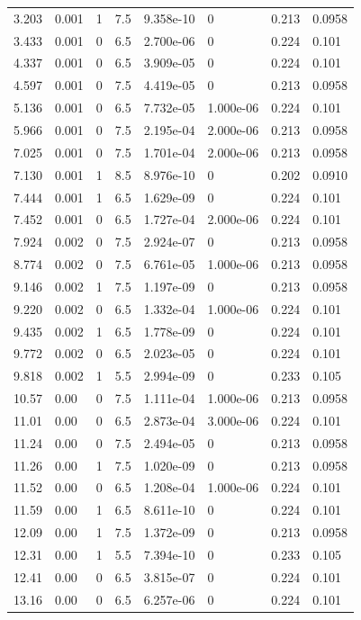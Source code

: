 \documentclass[preview]{standalone}
\begin{document}
{{\begin{tabular}{L{1.2cm}C{1.2cm} C{0.3cm}C{0.5cm} C{1.4cm}C{1.4cm} C{1.4cm}C{1.4cm}}
  3.203  &  0.001  & 1     & 7.5 &  9.358e-10  & 0  & 0.213 &  0.0958   \\ 
  3.433  &  0.001  & 0     & 6.5 &  2.700e-06  & 0  & 0.224 &  0.101   \\ 
  4.337  &  0.001  & 0     & 6.5 &  3.909e-05  & 0  & 0.224 &  0.101   \\ 
  4.597  &  0.001  & 0     & 7.5 &  4.419e-05  & 0  & 0.213 &  0.0958   \\ 
  5.136  &  0.001  & 0     & 6.5 &  7.732e-05  & 1.000e-06  & 0.224 &  0.101   \\ 
  5.966  &  0.001  & 0     & 7.5 &  2.195e-04  & 2.000e-06  & 0.213 &  0.0958   \\ 
  7.025  &  0.001  & 0     & 7.5 &  1.701e-04  & 2.000e-06  & 0.213 &  0.0958   \\ 
  7.130  &  0.001  & 1     & 8.5 &  8.976e-10  & 0  & 0.202 &  0.0910   \\ 
  7.444  &  0.001  & 1     & 6.5 &  1.629e-09  & 0  & 0.224 &  0.101   \\ 
  7.452  &  0.001  & 0     & 6.5 &  1.727e-04  & 2.000e-06  & 0.224 &  0.101   \\ 
  7.924  &  0.002  & 0     & 7.5 &  2.924e-07  & 0  & 0.213 &  0.0958   \\ 
  8.774  &  0.002  & 0     & 7.5 &  6.761e-05  & 1.000e-06  & 0.213 &  0.0958   \\ 
  9.146  &  0.002  & 1     & 7.5 &  1.197e-09  & 0  & 0.213 &  0.0958   \\ 
  9.220  &  0.002  & 0     & 6.5 &  1.332e-04  & 1.000e-06  & 0.224 &  0.101   \\ 
  9.435  &  0.002  & 1     & 6.5 &  1.778e-09  & 0  & 0.224 &  0.101   \\ 
  9.772  &  0.002  & 0     & 6.5 &  2.023e-05  & 0  & 0.224 &  0.101   \\ 
  9.818  &  0.002  & 1     & 5.5 &  2.994e-09  & 0  & 0.233 &  0.105   \\ 
  10.57  &  0.00  & 0     & 7.5 &  1.111e-04  & 1.000e-06  & 0.213 &  0.0958   \\ 
  11.01  &  0.00  & 0     & 6.5 &  2.873e-04  & 3.000e-06  & 0.224 &  0.101   \\ 
  11.24  &  0.00  & 0     & 7.5 &  2.494e-05  & 0  & 0.213 &  0.0958   \\ 
  11.26  &  0.00  & 1     & 7.5 &  1.020e-09  & 0  & 0.213 &  0.0958   \\ 
  11.52  &  0.00  & 0     & 6.5 &  1.208e-04  & 1.000e-06  & 0.224 &  0.101   \\ 
  11.59  &  0.00  & 1     & 6.5 &  8.611e-10  & 0  & 0.224 &  0.101   \\ 
  12.09  &  0.00  & 1     & 7.5 &  1.372e-09  & 0  & 0.213 &  0.0958   \\ 
  12.31  &  0.00  & 1     & 5.5 &  7.394e-10  & 0  & 0.233 &  0.105   \\ 
  12.41  &  0.00  & 0     & 6.5 &  3.815e-07  & 0  & 0.224 &  0.101   \\ 
  13.16  &  0.00  & 0     & 6.5 &  6.257e-06  & 0  & 0.224 &  0.101   \\ 
\hline 
\end{tabular} 

}}
\end{document}
